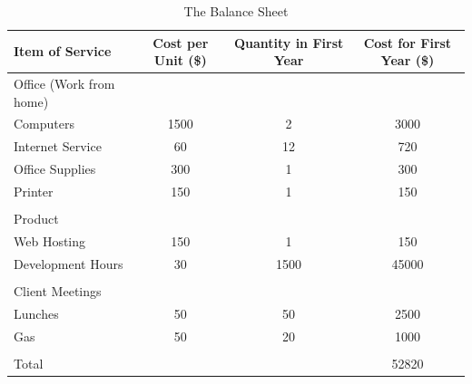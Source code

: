 \begin{table}[ht]
\caption{The Balance Sheet} %
\centering %
\begin{tabular}{| l c c c |} %
\hline
Item of Service & Cost per Unit (\$) & Quantity in First Year & Cost for First Year (\$) \\
\hline %
Office (Work from home) & & & \\
Computers & 1500 & 2 & 3000 \\
Internet Service & 60 & 12 & 720 \\
Office Supplies & 300 & 1 & 300 \\
Printer & 150 & 1 & 150 \\
 &   &   &   \\
Product &   &   &   \\
Web Hosting & 150 & 1 & 150 \\
Development Hours & 30 & 1500 & 45000 \\
  &   &   &   \\
Client Meetings &   &   &   \\
Lunches & 50 &  50 & 2500\\
Gas & 50 & 20 & 1000 \\
 &   &  &   \\
Total &   &   & 52820 \\

\hline %
\end{tabular}
\label{balanceSheet} %
\end{table}

